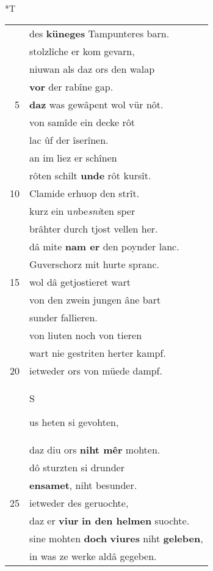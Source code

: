 \documentclass[8pt,a4paper,notitlepage]{article}
\begin{document}
\begin{table}[ht]
\begin{minipage}[t]{0.5\linewidth}
\end{minipage}
\hspace{0.5cm}
\begin{minipage}[t]{0.5\linewidth}
\small
\begin{center}*T
\end{center}
\begin{tabular}{rl}
 & des \textbf{küneges} Tampunteres barn.\\ 
 & stolzlîche er kom gevarn,\\ 
 & niuwan als daz ors den walap\\ 
 & \textbf{vor} der rabîne gap.\\ 
5 & \textbf{daz} was gewâpent wol vür nôt.\\ 
 & von samîde ein decke rôt\\ 
 & lac ûf der îserînen.\\ 
 & an im liez er schînen\\ 
 & rôten schilt \textbf{unde} rôt kursît.\\ 
10 & Clamide erhuop den strît.\\ 
 & kurz ein u\textit{n}be\textit{sni}ten sper\\ 
 & brâhter durch tjost vellen her.\\ 
 & dâ mite \textbf{nam er} den poynder lanc.\\ 
 & Guverschorz mit hurte spranc.\\ 
15 & wol dâ getjostieret wart\\ 
 & von den zwein jungen âne bart\\ 
 & sunder fallieren.\\ 
 & von liuten noch von tieren\\ 
 & wart nie gestriten herter kampf.\\ 
20 & ietweder ors von müede dampf.\\ 
 & \begin{large}S\end{large}us heten si gevohten,\\ 
 & daz diu ors \textbf{niht mêr} mohten.\\ 
 & dô sturzten si drunder\\ 
 & \textbf{ensamet}, niht besunder.\\ 
25 & ietweder des geruochte,\\ 
 & daz er \textbf{viur} \textbf{in den helmen} suochte.\\ 
 & sine mohten \textbf{doch} \textbf{viures} niht \textbf{geleben},\\ 
 & in was ze werke aldâ gegeben.\\ 

\end{tabular}
\end{minipage}
\end{table}
\end{document}
